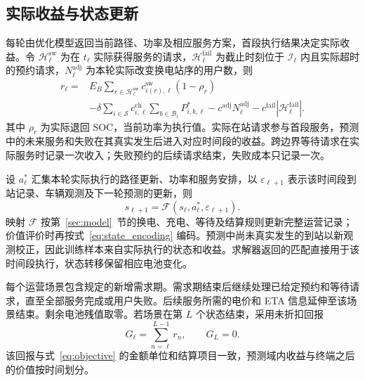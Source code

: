 \documentclass[12pt,a4paper,UTF8]{ctexart}
\numberwithin{equation}{section}
\begin{document}
\subsection{实际收益与状态更新}
\label{sec:reward}
每轮由优化模型返回当前路径、功率及相应服务方案，首段执行结果决定实际收益。令 $\mathcal H_\ell^{\mathrm{sw}}$ 为在 $t_\ell$ 实际获得服务的请求，$\mathcal H_\ell^{\mathrm{fail}}$ 为截止时刻位于 $\mathcal I_\ell$ 内且实际超时的预约请求，$N_\ell^{\mathrm{adj}}$ 为本轮实际改变换电站序的用户数，则
\begin{equation}
\begin{aligned}
r_\ell={}&E_B\sum_{r\in\mathcal H_\ell^{\mathrm{sw}}}
c_{i(r),\ell}^{\mathrm{sw}}(1-\rho_r)\\
&-\delta\sum_{i\in\mathcal S}c_{i,\ell}^{\mathrm{ch}}
\sum_{b\in\mathcal B_i}P_{i,b,\ell}^{*}
-c^{\mathrm{adj}}N_\ell^{\mathrm{adj}}
-c^{\mathrm{fail}}|\mathcal H_\ell^{\mathrm{fail}}|.
\end{aligned}
\label{eq:actual_reward}
\end{equation}
其中 $\rho_r$ 为实际退回 SOC，当前功率为执行值。实际在站请求参与首段服务，预测中的未来服务和失败在其真实发生后进入对应时间段的收益。跨边界等待请求在实际服务时记录一次收入；失败预约的后续请求结束，失败成本只记录一次。

设 $a_\ell^*$ 汇集本轮实际执行的路径更新、功率和服务安排，以 $\varepsilon_{\ell+1}$ 表示该时间段到站记录、车辆观测及下一轮预测的更新，则
\begin{equation}
s_{\ell+1}=\mathcal F(s_\ell,a_\ell^*,\varepsilon_{\ell+1}).
\label{eq:state_transition}
\end{equation}
映射 $\mathcal F$ 按第~\ref{sec:model}~节的换电、充电、等待及结算规则更新完整运营记录；价值评价时再按式~\eqref{eq:state_encoding} 编码。预测中尚未真实发生的到站以新观测校正，因此训练样本来自实际执行的状态和收益。求解器返回的匹配直接用于该时间段执行，状态转移保留相应电池变化。

每个运营场景包含规定的新增需求期。需求期结束后继续处理已给定预约和等待请求，直至全部服务完成或用户失败。后续服务所需的电价和 ETA 信息延伸至该场景结束。剩余电池残值取零。若场景在第 $L$ 个状态结束，采用未折扣回报
\begin{equation}
G_\ell=\sum_{n=\ell}^{L-1}r_n,\qquad G_L=0.
\label{eq:return_target}
\end{equation}
该回报与式~\eqref{eq:objective} 的金额单位和结算项目一致，预测域内收益与终端之后的价值按时间划分。
\end{document}
